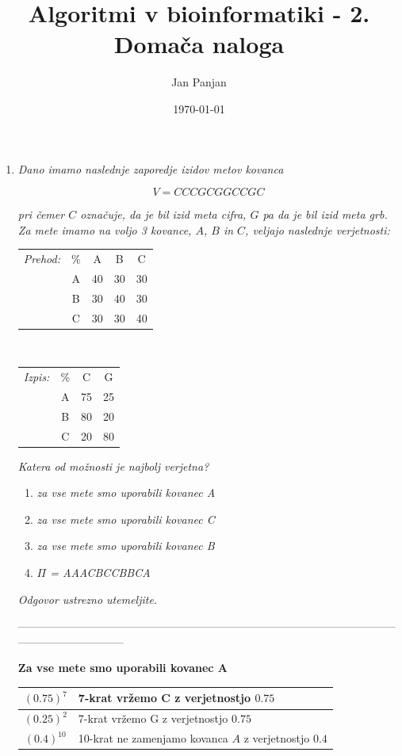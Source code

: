 \documentclass{article}
\title{Algoritmi v bioinformatiki - 2. Domača naloga}
\author{Jan Panjan}
\date{\today}
\begin{document}
\maketitle

\newpage

\begin{enumerate}
	\item  \textit{Dano imamo naslednje zaporedje izidov metov kovanca}

		$$
		V = CCCGCGGCCGC
		$$

		\textit{pri čemer $C$ označuje, da je bil izid meta cifra, $G$ pa da je bil izid meta grb.
		Za mete imamo na voljo 3 kovance, $A$, $B$ in $C$, veljajo naslednje verjetnosti:}

		\begin{tabular}{cc||c|c|c|}
			\multicolumn{1}{c}{\textit{Prehod:}} & \%  & A & B & C\tabularnewline
			\cline{2-5}
										& A & 40 & 30 & 30 \tabularnewline
										\cline{2-5}
										& B & 30 & 40 & 30\tabularnewline
										\cline{2-5}
										& C & 30 & 30 & 40 \tabularnewline
		\end{tabular}$\,\,\,\,\,\,\,\,\,\,\,\,\,\,\,\,\,\,\,\,$%
		\begin{tabular}{cc||c|c|}
			\multicolumn{1}{c}{\textit{Izpis:}} & \% & C & G\tabularnewline
			\cline{2-4}
									   & A & 75 & 25\tabularnewline
									   \cline{2-4}
									   & B & 80 & 20\tabularnewline
									   \cline{2-4}
									   & C & 20 & 80\tabularnewline
		\end{tabular}

		\textit{Katera od možnosti je najbolj verjetna?}

			\begin{enumerate}
				\item \textit{za vse mete smo uporabili kovanec A}
				\item \textit{za vse mete smo uporabili kovanec C}
				\item \textit{za vse mete smo uporabili kovanec B}
				\item \textit{$\Pi$ = AAACBCCBBCA}
			\end{enumerate}

			\textit{Odgovor ustrezno utemeljite.}

			-----------------------------------------------------------------------------------------------------------------------------------

			\textbf{Za vse mete smo uporabili kovanec A}

			\begin{center}
				\begin{tabular}{c||l}
					$(0.75)^7$ & 7-krat vržemo C z verjetnostjo $0.75$ \\
					\hline
					$(0.25)^2$ & 7-krat vržemo G z verjetnostjo $0.75$ \\
					\hline
					$(0.4)^{10}$ & 10-krat ne zamenjamo kovanca $A$ z verjetnostjo $0.4$
				\end{tabular}


\end{center}
\end{enumerate}
\end{document}
